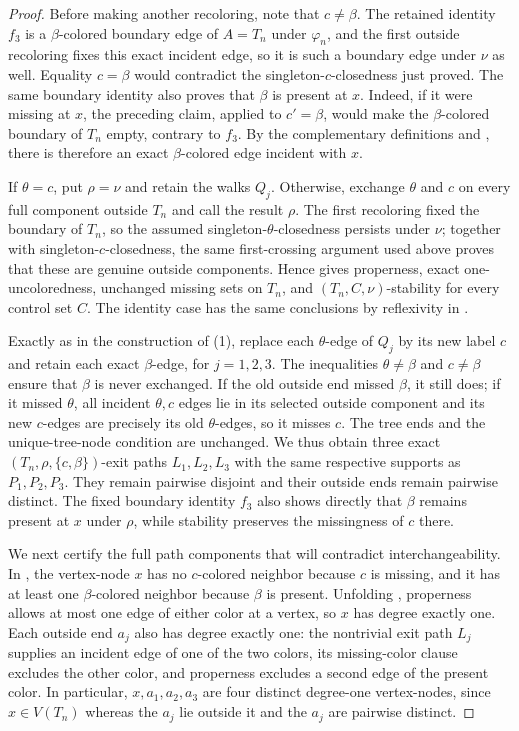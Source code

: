 \begin{proof}
Before making another recoloring, note that $c\ne\beta$.  The retained
identity $f_3$ is a $\beta$-colored boundary edge of $A=T_n$ under
$\varphi_n$, and the first outside recoloring fixes this exact incident
edge, so it is such a boundary edge under $\nu$ as well.  Equality
$c=\beta$ would contradict the singleton-$c$-closedness just proved.
The same boundary identity also proves that $\beta$ is present at $x$.
Indeed, if it were missing at $x$, the preceding claim, applied to
$c'=\beta$, would make the $\beta$-colored boundary of $T_n$ empty,
contrary to $f_3$.  By the complementary definitions
 and , there is therefore
an exact $\beta$-colored edge incident with $x$.

If $\theta=c$, put $\rho=\nu$ and retain the walks $Q_j$.  Otherwise,
exchange $\theta$ and $c$ on every full component outside $T_n$ and call
the result $\rho$.  The first recoloring fixed the boundary of $T_n$, so
the assumed singleton-$\theta$-closedness persists under $\nu$;
together with singleton-$c$-closedness, the same first-crossing argument
used above proves that these are genuine outside components.  Hence
 gives properness, exact
one-uncoloredness, unchanged missing sets on $T_n$, and
$(T_n,C,\nu)$-stability for every control set $C$.  The identity case has
the same conclusions by reflexivity in .

Exactly as in the construction of (1), replace each $\theta$-edge of
$Q_j$ by its new label $c$ and retain each exact $\beta$-edge, for
$j=1,2,3$.  The inequalities $\theta\ne\beta$ and $c\ne\beta$ ensure
that $\beta$ is never exchanged.  If the old outside end missed
$\beta$, it still does; if it missed $\theta$, all incident
$\theta,c$ edges lie in its selected outside component and its new
$c$-edges are precisely its old $\theta$-edges, so it misses $c$.
The tree ends and the unique-tree-node condition are unchanged.  We thus
obtain three exact $(T_n,\rho,\{c,\beta\})$-exit paths
$L_1,L_2,L_3$ with the same respective supports as $P_1,P_2,P_3$.
They remain pairwise disjoint and their outside ends remain pairwise
distinct.  The fixed boundary identity $f_3$ also shows directly that
$\beta$ remains present at $x$ under $\rho$, while stability preserves
the missingness of $c$ there.

We next certify the full path components that will contradict
interchangeability.  In , the
vertex-node $x$ has no $c$-colored neighbor because $c$ is missing, and
it has at least one $\beta$-colored neighbor because $\beta$ is present.
Unfolding , properness allows at most one
edge of either color at a vertex, so $x$ has degree exactly one.  Each
outside end $a_j$ also has degree exactly one: the nontrivial exit path
$L_j$ supplies an incident edge of one of the two colors, its
missing-color clause excludes the other color, and properness excludes a
second edge of the present color.  In particular,
$x,a_1,a_2,a_3$ are four distinct degree-one vertex-nodes, since
$x\in V(T_n)$ whereas the $a_j$ lie outside it and the $a_j$ are
pairwise distinct.


\end{proof}
